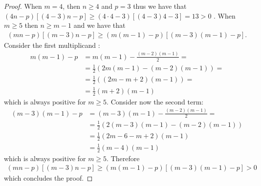 \begin{proof}
	When $m=4$, then $n\geq4$ and $p=3$ thus we have that $(4n-p)[(4-3)n-p]\geq(4 \cdot 4-3)[(4-3)4-3]=13>0$ . When $m\geq5$ then $n ≥ m - 1$ and we have that
	\begin{align*}
		(mn-p)[(m-3)n-p] \geq (m(m-1)-p)[(m-3)(m-1)-p]. 
	\end{align*}
	Consider the first multiplicand :
	\begin{align*}
		m(m-1)-p &= m(m-1)-\frac{(m-2)(m-1)}{2}= \\
		&=\frac{1}{2}(2m(m-1)-(m-2)(m-1))=\\
		&=\frac{1}{2}((2m-m+2)(m-1))=\\
		&=\frac{1}{2}(m+2)(m-1)
	\end{align*}
	which is always positive for $m\geq5$. Consider now the second term:
	\begin{align*}
		(m-3)(m-1)-p &= (m-3)(m-1)-\frac{(m-2)(m-1)}{2}= \\
		&=\frac{1}{2}(2(m-3)(m-1)-(m-2)(m-1))\\
		&=\frac{1}{2}(2m-6-m+2)(m-1)\\
		&=\frac{1}{2}(m-4)(m-1)
	\end{align*}
	which is always positive for $m\geq5$. Therefore
	\begin{align*}
		(mn-p)[(m-3)n-p] \geq (m(m-1)-p)[(m-3)(m-1)-p] > 0 
	\end{align*}
	which concludes the proof.
	
\end{proof}


